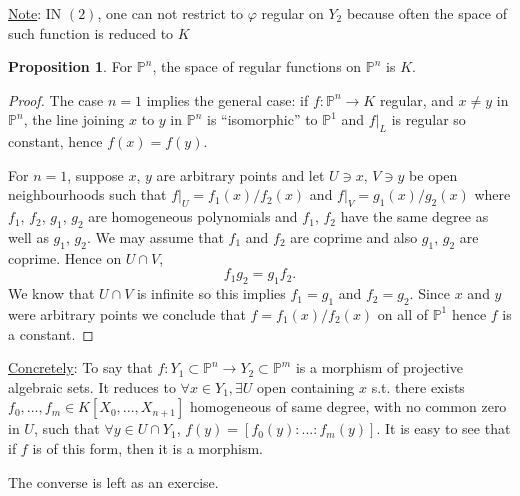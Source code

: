 \documentclass[11pt]{article}
\theoremstyle{definition}
\newtheorem{prop}[thm]{Proposition}
\newcommand{\proj}{\mathbb P}
\newcommand{\lrta}{\longrightarrow}
\begin{document}
\underline{Note}: IN $(2)$, one can not restrict to $\varphi$ regular on $Y_2$ because often the space of such function is reduced to $K$
\begin{prop}
For $\proj^n$, the space of regular functions on $\proj^n$ is $K$.
\end{prop}
\begin{proof}
The case $n=1$ implies the general case: if $f:\proj^n\lrta K$ regular, and $x\neq y$ in $\proj^n$, the line joining $x$ to $y$ in $\proj^n$ is ``isomorphic'' to $\proj^1$ and $f|_L$ is regular so constant, hence $f(x)=f(y)$.

For $n=1$, suppose $x$, $y$ are arbitrary points and let $U \ni x$, $V\ni y$ be open neighbourhoods such that $f|_U =f_1(x)/f_2(x)$ and $f|_V = g_1(x)/g_2(x)$ where $f_1$, $f_2$, $g_1$, $g_2$ are homogeneous polynomials and $f_1$, $f_2$ have the same degree as well as $g_1$, $g_2$. We may assume that $f_1$ and $f_2$ are coprime and also $g_1$, $g_2$ are coprime. Hence on $U \cap V$,
$$
f_1 g_2 = g_1 f_2.
$$
We know that $U \cap V$ is infinite so this implies $f_1 = g_1$ and $ f_2 = g_2$. Since $x$ and $y$ were arbitrary points we conclude that $f = f_1(x)/f_2(x)$ on all of $\proj^1$ hence $f$ is a constant.
\end{proof}
\underline{Concretely}: To say that $f: Y_1\subset \proj^n\lrta Y_2\subset \proj^m$  is a morphism of projective algebraic sets. It reduces to 
$\forall x\in Y_1,\exists U$ open containing $x$ s.t. there exists $f_0,...,f_m\in K[X_0,...,X_{n+1}]$
homogeneous of same degree, with no common zero in $U$, such that
$\forall y\in U\cap Y_1$, $f(y)=[f_0(y):...:f_m(y)]$. It is easy to see that if $f$ is of this form, then it is a morphism.

The converse is left as an exercise.
\end{document}
